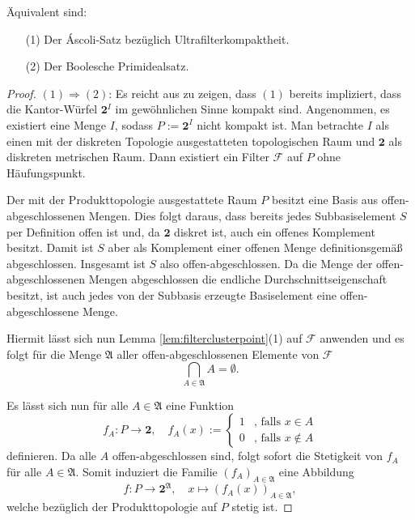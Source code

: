 \begin{thm}
  \label{thm:ultrafiltercompact}
  Äquivalent sind:
  \begin{enumerate}
    \item[(1)] Der Áscoli-Satz bezüglich Ultrafilterkompaktheit.
    \item[(2)] Der Boolesche Primidealsatz.
  \end{enumerate}
\end{thm}

\begin{proof}
  $(1)\Rightarrow(2) $: Es reicht aus zu zeigen, dass $(1)$ bereits impliziert, dass die Kantor-Würfel $\mathbf{2}^I$ im gewöhnlichen Sinne kompakt sind.
  Angenommen, es existiert eine Menge $I$, sodass $P:= \mathbf{2}^I$ nicht kompakt ist.
  Man betrachte $I$ als einen mit der diskreten Topologie ausgestatteten topologischen Raum und $\mathbf{2}$ als diskreten metrischen Raum.
  Dann existiert ein Filter $\mathcal{F}$ auf $P$ ohne Häufungspunkt.

  Der mit der Produkttopologie ausgestattete Raum $P$ besitzt eine Basis aus offen-ab\-ge\-schlossenen Mengen.
  Dies folgt daraus, dass bereits jedes Subbasiselement $S$ per Definition offen ist und, da $\mathbf{2}$ diskret ist, auch ein offenes Komplement besitzt.
  Damit ist $S$ aber als Komplement einer offenen Menge definitionsgemäß abgeschlossen.
  Insgesamt ist $S$ also offen-abgeschlossen.
  Da die Menge der offen-abgeschlossenen Mengen abgeschlossen die endliche Durchschnittseigenschaft besitzt, ist auch jedes von der Subbasis erzeugte Basiselement eine offen-abgeschlossene Menge.

  Hiermit lässt sich nun Lemma \ref{lem:filterclusterpoint}(1) auf $\mathcal{F}$ anwenden und es folgt für die Menge $\mathfrak{A}$ aller offen-abgeschlossenen Elemente von $\mathcal{F}$
  \begin{displaymath}
    \bigcap_{A \in \mathfrak{A}} A = \emptyset \tag{$\ast$}.
  \end{displaymath}

  Es lässt sich nun für alle $A \in \mathfrak{A}$ eine Funktion
  \begin{equation}
    \label{eq:clopenmap}
    f_A \colon P \to \mathbf{2}, \quad
    f_A(x) := 
    \begin{cases}
      1 &\text{, falls } x \in A \\
      0 &\text{, falls } x \not\in A
    \end{cases}
  \end{equation}
  definieren.
  Da alle $A$ offen-abgeschlossen sind, folgt sofort die Stetigkeit von $f_A$ für alle $A \in \mathfrak{A}$.
  Somit induziert die Familie $(f_A)_{A \in \mathfrak{A}}$ eine Abbildung 
  \begin{displaymath}
    f \colon P \to \mathbf{2}^\mathfrak{A}, \quad
    x \mapsto (f_A(x))_{A \in \mathfrak{A}},
  \end{displaymath}
  welche bezüglich der Produkttopologie auf $P$ stetig ist.


\end{proof}
